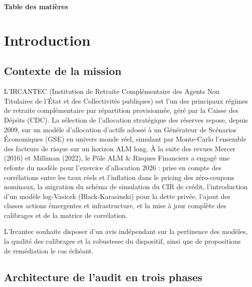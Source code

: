 \documentclass[11pt,a4paper]{article}
\begin{document}
\clearpage
\begingroup
\hypersetup{hidelinks}
{\noindent\sffamily\Huge\bfseries\color{nxnavy}Table des matières\par}
\vspace{12mm}
\tableofcontents
\endgroup
\clearpage

\section{Introduction}

\subsection{Contexte de la mission}

L'IRCANTEC (Institution de Retraite Complémentaire des Agents Non Titulaires de l'État et des Collectivités publiques) est l'un des principaux régimes de retraite complémentaire par répartition provisionnée, géré par la Caisse des Dépôts (CDC). La sélection de l'allocation stratégique des réserves repose, depuis 2009, sur un modèle d'allocation d'actifs adossé à un Générateur de Scénarios Économiques (GSE) en univers monde réel, simulant par Monte-Carlo l'ensemble des facteurs de risque sur un horizon ALM long. À la suite des revues Mercer (2016) et Milliman (2022), le Pôle ALM \& Risques Financiers a engagé une refonte du modèle pour l'exercice d'allocation 2026 : prise en compte des corrélations entre les taux réels et l'inflation dans le pricing des zéro-coupons nominaux, la migration du schéma de simulation du CIR de crédit, l'introduction d'un modèle log-Vasicek (Black-Karasinski) pour la dette privée, l'ajout des classes actions émergentes et infrastructure, et la mise à jour complète des calibrages et de la matrice de corrélation.

\noindent L'Ircantec souhaite disposer d'un avis indépendant sur la pertinence des modèles, la qualité des calibrages et la robustesse du dispositif, ainsi que de propositions de remédiation le cas échéant.

\subsection{Architecture de l'audit en trois phases}
\end{document}
